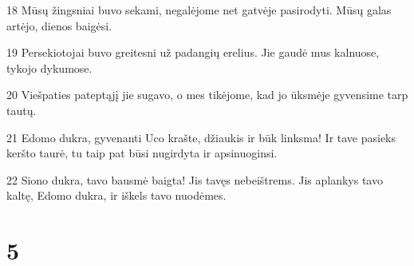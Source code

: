 \par 18 Mūsų žingsniai buvo sekami, negalėjome net gatvėje pasirodyti. Mūsų galas artėjo, dienos baigėsi. 
\par 19 Persekiotojai buvo greitesni už padangių erelius. Jie gaudė mus kalnuose, tykojo dykumose. 
\par 20 Viešpaties pateptąjį jie sugavo, o mes tikėjome, kad jo ūksmėje gyvensime tarp tautų. 
\par 21 Edomo dukra, gyvenanti Uco krašte, džiaukis ir būk linksma! Ir tave pasieks keršto taurė, tu taip pat būsi nugirdyta ir apsinuoginsi. 
\par 22 Siono dukra, tavo bausmė baigta! Jis tavęs nebeištrems. Jis aplankys tavo kaltę, Edomo dukra, ir iškels tavo nuodėmes.



\chapter{5}


